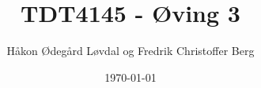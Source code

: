 \title{TDT4145 - Øving 3}
\author{Håkon Ødegård Løvdal og Fredrik Christoffer Berg}
\date{\today}
\maketitle